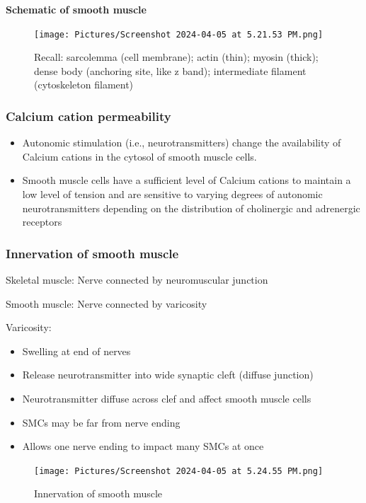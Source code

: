 \documentclass[11pt,fleqn]{book}
\begin{document}
\textbf{Schematic of smooth muscle}
\begin{figure}[h!]
\begin{center}
    \texttt{[image: Pictures/Screenshot 2024-04-05 at 5.21.53 PM.png]}
\end{center}
    \caption{Recall: sarcolemma (cell membrane); actin (thin); myosin (thick); dense body (anchoring site, like z band); intermediate filament (cytoskeleton filament)}
\end{figure}

\subsubsection{Calcium cation permeability}
\begin{itemize}
    \item Autonomic stimulation (i.e., neurotransmitters)
change the availability of Calcium cations in the cytosol of
smooth muscle cells.
    \item Smooth muscle cells have a sufficient level of Calcium cations
to maintain a low level of tension and are sensitive
to varying degrees of autonomic neurotransmitters
depending on the distribution of cholinergic and
adrenergic receptors
\end{itemize}

\subsubsection{Innervation of smooth muscle}
\begin{descriptions}
    \item[Skeletal muscle: ]Nerve connected by neuromuscular junction
    \item[Smooth muscle: ]Nerve connected by varicosity
    \item[Varicosity: ]\begin{descriptions}
    \end{descriptions} 
    \begin{itemize}
        \item Swelling at end of nerves
        \item Release neurotransmitter into wide synaptic cleft (diffuse
junction)
        \item Neurotransmitter diffuse across clef and affect smooth
muscle cells
        \item SMCs may be far from nerve ending
        \item Allows one nerve ending to impact many SMCs at once
    \end{itemize}
\end{descriptions}
\begin{figure}[h!]
\begin{center}
    \texttt{[image: Pictures/Screenshot 2024-04-05 at 5.24.55 PM.png]}
\end{center}
    \caption{Innervation of smooth muscle}
\end{figure}
\end{document}
